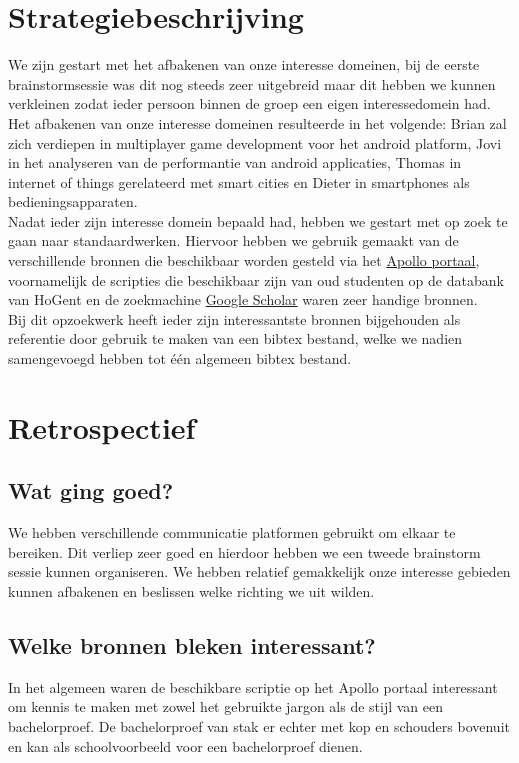 \documentclass[fleqn,10pt]{voorstel}
\begin{document}
\section{Strategiebeschrijving}
We zijn gestart met het afbakenen van onze interesse domeinen, bij de eerste brainstormsessie was dit nog steeds zeer uitgebreid maar dit hebben we kunnen verkleinen zodat ieder persoon binnen de groep een eigen interessedomein had. \\
Het afbakenen van onze interesse domeinen resulteerde in het volgende: Brian zal zich verdiepen in multiplayer game development voor het android platform, Jovi in het analyseren van de performantie van android applicaties, Thomas in internet of things gerelateerd met smart cities en Dieter in smartphones als bedieningsapparaten. \\
Nadat ieder zijn interesse domein bepaald had, hebben we gestart met op zoek te gaan naar standaardwerken. Hiervoor hebben we gebruik gemaakt van de verschillende bronnen die beschikbaar worden gesteld via het \href{http://apollo.hogent.be/}{Apollo portaal}, voornamelijk de scripties die beschikbaar zijn van oud studenten op  de databank van HoGent en de zoekmachine \href{https://scholar.google.be/}{Google Scholar} waren zeer handige bronnen. \\
Bij dit opzoekwerk heeft ieder zijn interessantste bronnen bijgehouden als referentie door gebruik te maken van een bibtex bestand, welke we nadien samengevoegd hebben tot één algemeen bibtex bestand.

\section{Retrospectief}
\subsection{Wat ging goed?}
We hebben verschillende communicatie platformen gebruikt om elkaar te bereiken. Dit verliep zeer goed en hierdoor hebben we een tweede brainstorm sessie kunnen organiseren.
We hebben relatief gemakkelijk onze interesse gebieden kunnen afbakenen en beslissen welke richting we uit wilden.

\subsection{Welke bronnen bleken interessant?}
In het algemeen waren de beschikbare scriptie op het Apollo portaal interessant om kennis te maken met zowel het gebruikte jargon als de stijl van een bachelorproef. De bachelorproef van \cite{VanderPlaetsen2013} stak er echter met kop en schouders bovenuit en kan als schoolvoorbeeld voor een bachelorproef dienen.
\end{document}
